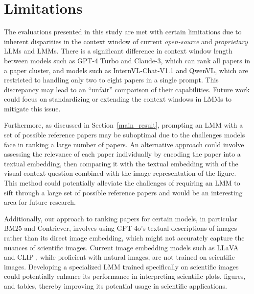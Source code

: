 \section*{Limitations}
\label{limitations}
The evaluations presented in this study are met with certain limitations due to inherent disparities in the context window of current \emph{open-source} and \emph{proprietary} LLMs and LMMs. 
There is a significant difference in context window length between models such as GPT-4 Turbo and Claude-3, which can rank all papers in a paper cluster, and models such as InternVL-Chat-V1.1 and QwenVL, which are restricted to handling only two to eight papers in a single prompt. 
This discrepancy may lead to an ``unfair'' comparison of their capabilities. 
Future work could focus on standardizing or extending the context windows in LMMs to mitigate this issue. 

Furthermore, as discussed in Section~\ref{main_result}, prompting an LMM with a set of possible reference papers may be suboptimal due to the challenges models face in ranking a large number of papers. An alternative approach could involve assessing the relevance of each paper individually by encoding the paper into a textual embedding, then comparing it with the textual embedding with of the visual context question combined with the image representation of the figure. This method could potentially alleviate the challenges of requiring an LMM to sift through a large set of possible reference papers and would be an interesting area for future research.

Additionally, our approach to ranking papers for certain models, in particular BM25 and Contriever, involves using GPT-4o's textual descriptions of images rather than its direct image embedding, which might not accurately capture the nuances of scientific images. 
Current image embedding models such as LLaVA \cite{liu2023visual} and CLIP \cite{radford2021learning}, while proficient with natural images, are not trained on scientific images. 
Developing a specialized LMM trained specifically on scientific images~\cite{li2024multimodal, wu2024scimmir} could potentially enhance its performance in interpreting scientific plots, figures, and tables, thereby improving its potential usage in scientific applications. 